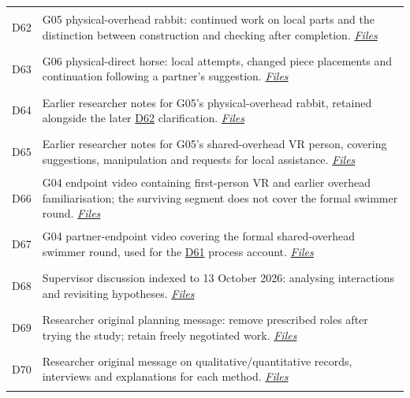 \begin{longtable}{@{}p{14mm}>{\raggedright\arraybackslash}p{140mm}@{}}
\hypertarget{src:D62}{}\label{src:D62}D62 & G05 physical-overhead rabbit: continued work on local parts and the distinction between construction and checking after completion. \href{https://github.com/YiyangQin-UQ/REIT7841/blob/main/thesis/v1.1/materials/README.md\#d62}{\textit{Files}} \\
\hypertarget{src:D63}{}\label{src:D63}D63 & G06 physical-direct horse: local attempts, changed piece placements and continuation following a partner's suggestion. \href{https://github.com/YiyangQin-UQ/REIT7841/blob/main/thesis/v1.1/materials/README.md\#d63}{\textit{Files}} \\
\hypertarget{src:D64}{}\label{src:D64}D64 & Earlier researcher notes for G05's physical-overhead rabbit, retained alongside the later \hyperlink{src:D62}{D62} clarification. \href{https://github.com/YiyangQin-UQ/REIT7841/blob/main/thesis/v1.1/materials/README.md\#d64}{\textit{Files}} \\
\hypertarget{src:D65}{}\label{src:D65}D65 & Earlier researcher notes for G05's shared-overhead VR person, covering suggestions, manipulation and requests for local assistance. \href{https://github.com/YiyangQin-UQ/REIT7841/blob/main/thesis/v1.1/materials/README.md\#d65}{\textit{Files}} \\
\hypertarget{src:D66}{}\label{src:D66}D66 & G04 endpoint video containing first-person VR and earlier overhead familiarisation; the surviving segment does not cover the formal swimmer round. \href{https://github.com/YiyangQin-UQ/REIT7841/blob/main/thesis/v1.1/materials/README.md\#d66}{\textit{Files}} \\
\hypertarget{src:D67}{}\label{src:D67}D67 & G04 partner-endpoint video covering the formal shared-overhead swimmer round, used for the \hyperlink{src:D61}{D61} process account. \href{https://github.com/YiyangQin-UQ/REIT7841/blob/main/thesis/v1.1/materials/README.md\#d67}{\textit{Files}} \\
\hypertarget{src:D68}{}\label{src:D68}D68 & Supervisor discussion indexed to 13 October 2026: analysing interactions and revisiting hypotheses. \href{https://github.com/YiyangQin-UQ/REIT7841/blob/main/thesis/v1.1/materials/README.md\#d68}{\textit{Files}} \\
\hypertarget{src:D69}{}\label{src:D69}D69 & Researcher original planning message: remove prescribed roles after trying the study; retain freely negotiated work. \href{https://github.com/YiyangQin-UQ/REIT7841/blob/main/thesis/v1.1/materials/README.md\#d69}{\textit{Files}} \\
\hypertarget{src:D70}{}\label{src:D70}D70 & Researcher original message on qualitative/quantitative records, interviews and explanations for each method. \href{https://github.com/YiyangQin-UQ/REIT7841/blob/main/thesis/v1.1/materials/README.md\#d70}{\textit{Files}} \\

\end{longtable}
